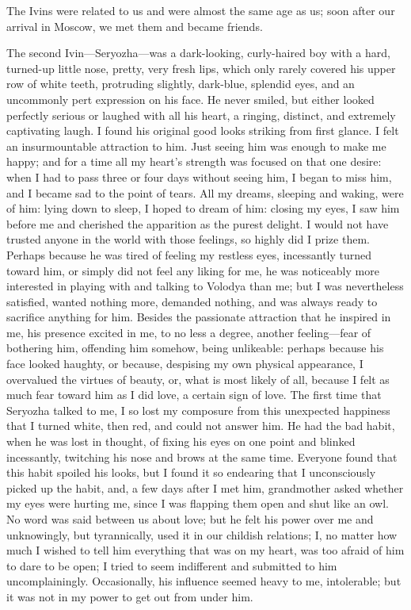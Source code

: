 The Ivins were related to us and were almost the same age as us; soon after our arrival in Moscow, we met them and became friends.

The second Ivin---Seryozha---was a dark-looking, curly-haired boy with a hard, turned-up little nose, pretty, very fresh lips, which only rarely covered his upper row of white teeth, protruding slightly, dark-blue, splendid eyes, and an uncommonly pert expression on his face. He never smiled, but either looked perfectly serious or laughed with all his heart, a ringing, distinct, and extremely captivating laugh. I found his original good looks striking from first glance. I felt an insurmountable attraction to him. Just seeing him was enough to make me happy; and for a time all my heart's strength was focused on that one desire: when I had to pass three or four days without seeing him, I began to miss him, and I became sad to the point of tears. All my dreams, sleeping and waking, were of him: lying down to sleep, I hoped to dream of him: closing my eyes, I saw him before me and cherished the apparition as the purest delight. I would not have trusted anyone in the world with those feelings, so highly did I prize them. Perhaps because he was tired of feeling my restless eyes, incessantly turned toward him, or simply did not feel any liking for me, he was noticeably more interested in playing with and talking to Volodya than me; but I was nevertheless satisfied, wanted nothing more, demanded nothing, and was always ready to sacrifice anything for him. Besides the passionate attraction that he inspired in me, his presence excited in me, to no less a degree, another feeling---fear of bothering him, offending him somehow, being unlikeable: perhaps because his face looked haughty, or because, despising my own physical appearance, I overvalued the virtues of beauty, or, what is most likely of all, because I felt as much fear toward him as I did love, a certain sign of love. The first time that Seryozha talked to me, I so lost my composure from this unexpected happiness that I turned white, then red, and could not answer him. He had the bad habit, when he was lost in thought, of fixing his eyes on one point and blinked incessantly, twitching his nose and brows at the same time. Everyone found that this habit spoiled his looks, but I found it so endearing that I unconsciously picked up the habit, and, a few days after I met him, grandmother asked whether my eyes were hurting me, since I was flapping them open and shut like an owl. No word was said between us about love; but he felt his power over me and unknowingly, but tyrannically, used it in our childish relations; I, no matter how much I wished to tell him everything that was on my heart, was too afraid of him to dare to be open; I tried to seem indifferent and submitted to him uncomplainingly. Occasionally, his influence seemed heavy to me, intolerable; but it was not in my power to get out from under him.

